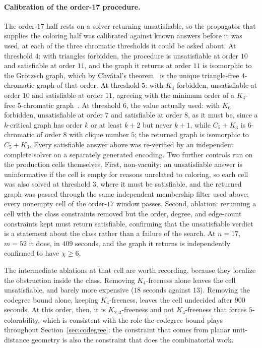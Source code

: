 \documentclass[11pt]{article}
\theoremstyle{definition}
\newcommand{\chrom}{\chi}
\begin{document}
\paragraph{Calibration of the order-17 procedure.} The order-$17$ half rests on a
solver returning unsatisfiable, so the propagator that supplies the coloring half
was calibrated against known answers before it was used, at each of the three
chromatic thresholds it could be asked about. At threshold $4$: with triangles
forbidden, the procedure is unsatisfiable at order $10$ and satisfiable at order
$11$, and the graph it returns at order $11$ is isomorphic to the Gr\"otzsch graph,
which by Chv\'atal's theorem~\cite{Chvatal1974} is the unique triangle-free
$4$-chromatic graph of that order. At threshold $5$: with $K_4$ forbidden, unsatisfiable at order $10$ and
satisfiable at order $11$, agreeing with the minimum order of a $K_4$-free
$5$-chromatic graph~\cite{JensenRoyle1995}. At threshold $6$, the value actually
used: with $K_6$ forbidden, unsatisfiable at order $7$ and satisfiable at order
$8$, as it must be, since a $k$-critical graph has order $k$ or at least $k+2$ but
never $k+1$, while $C_5 + K_3$ is $6$-chromatic of order $8$ with clique number
$5$; the returned graph is isomorphic to $C_5 + K_3$. Every satisfiable answer
above was re-verified by an independent complete solver on a separately generated
encoding. Two further controls run on the production cells themselves. First,
non-vacuity: an unsatisfiable answer is uninformative if the cell is empty for
reasons unrelated to coloring, so each cell was also solved at threshold $3$,
where it must be satisfiable, and the returned graph was passed through the same
independent membership filter used above; every nonempty cell of the order-$17$
window passes. Second, ablation: rerunning a cell with the class constraints
removed but the order, degree, and edge-count constraints kept must return
satisfiable, confirming that the unsatisfiable verdict is a statement about the
class rather than a failure of the search. At $n = 17$, $m = 52$ it does, in
$409$ seconds, and the graph it returns is independently confirmed to have
$\chrom \ge 6$.

The intermediate ablations at that cell are worth recording, because they
localize the obstruction inside the class. Removing $K_4$-freeness alone leaves
the cell unsatisfiable, and barely more expensive ($18$ seconds against $13$).
Removing the codegree bound alone, keeping $K_4$-freeness, leaves the cell
undecided after $900$ seconds. At this order, then, it is $K_{2,3}$-freeness and
not $K_4$-freeness that forces $5$-colorability, which is consistent with the
role the codegree bound plays throughout Section~\ref{sec:codegree}: the
constraint that comes from planar unit-distance geometry is also the constraint
that does the combinatorial work.
\end{document}

